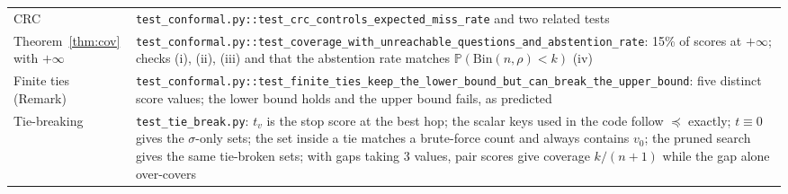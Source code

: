 \documentclass[11pt,a4paper]{article}
\theoremstyle{definition}
\theoremstyle{remark}
\newcommand{\Prob}{\mathbb{P}}
\newcommand{\code}[1]{\texttt{#1}}
\begin{document}
\begin{center}
\begin{tabularx}{\textwidth}{@{}>{\raggedright\arraybackslash}p{5cm}X@{}}
CRC & \code{test\_conformal.py::test\_crc\_controls\_expected\_miss\_rate} and two related tests\\
Theorem~\ref{thm:cov} with $+\infty$ & \code{test\_conformal.py::test\_coverage\_with\_unreachable\_questions\_and\_abstention\_rate}: 15\% of scores at $+\infty$; checks (i), (ii), (iii) and that the abstention rate matches $\Prob(\mathrm{Bin}(n,\rho)<k)$ (iv)\\
Finite ties (Remark) & \code{test\_conformal.py::test\_finite\_ties\_keep\_the\_lower\_bound\_but\_can\_break\_the\_upper\_bound}: five distinct score values; the lower bound holds and the upper bound fails, as predicted\\
Tie-breaking & \code{test\_tie\_break.py}: $t_v$ is the stop score at the best hop; the scalar keys used in the code follow $\preceq$ exactly; $t\equiv0$ gives the $\sigma$-only sets; the set inside a tie matches a brute-force count and always contains $v_0$; the pruned search gives the same tie-broken sets; with gaps taking 3 values, pair scores give coverage $k/(n+1)$ while the gap alone over-covers\\
\bottomrule
\end{tabularx}
\end{center}
\end{document}
